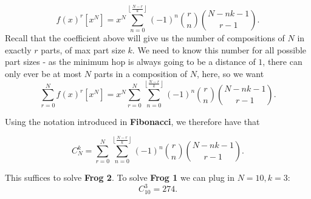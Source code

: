 \documentclass[hidelinks]{article}
\begin{document}
\begin{equation}
f(x)^r[x^N]=x^N\sum_{n=0}^{\left \lfloor{\frac{N-r}{k}}\right \rfloor}(-1)^{n}\binom{r}{n}\binom{N-nk-1}{r-1}.
\end{equation}
Recall that the coefficient above will give us the number of compositions of $N$ in exactly $r$ parts, of max part size $k$. We need to know this number for all possible part sizes - as the minimum hop is always going to be a distance of $1$, there can only ever be at most $N$ parts in a composition of $N$, here, so we want 
\begin{equation}
\sum_{r=0}^Nf(x)^r[x^N]=x^N\sum_{r=0}^N\sum_{n=0}^{\left \lfloor{\frac{N-r}{k}}\right \rfloor}(-1)^{n}\binom{r}{n}\binom{N-nk-1}{r-1}.
\end{equation}

Using the notation introduced in \textbf{Fibonacci}, we therefore have that

\begin{equation}
C^k_N = \sum_{r=0}^N\sum_{n=0}^{\left \lfloor{\frac{N-r}{k}}\right \rfloor}(-1)^{n}\binom{r}{n}\binom{N-nk-1}{r-1}.
\end{equation}

This suffices to solve \textbf{Frog 2}. To solve \textbf{Frog 1} we can plug in $N=10, k=3$:
\begin{equation}
C^3_{10}=274. 
\end{equation}
\end{document}
